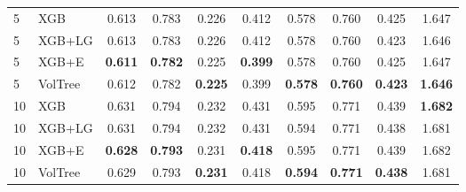 \documentclass[runningheads]{llncs}
\begin{document}
\begin{table}[t]
\begin{tabular}{ll cccc cccc}
\midrule
5 & XGB      & 0.613 & 0.783 & 0.226 & 0.412 & 0.578 & 0.760 & 0.425 & 1.647 \\ %
5 & XGB+LG   & 0.613 & 0.783 & 0.226 & 0.412 & 0.578 & 0.760 & 0.423 & 1.646 \\ %
5 & XGB+E    & \textbf{0.611} & \textbf{0.782} & 0.225 & \textbf{0.399} & 0.578 & 0.760 & 0.425 & 1.647 \\ %
5 & VolTree & 0.612 & 0.782 & \textbf{0.225} & 0.399 & \textbf{0.578} & \textbf{0.760} & \textbf{0.423} & \textbf{1.646} \\ %
\midrule
10 & XGB      & 0.631 & 0.794 & 0.232 & 0.431 & 0.595 & 0.771 & 0.439 & \textbf{1.682} \\ %
10 & XGB+LG   & 0.631 & 0.794 & 0.232 & 0.431 & 0.594 & 0.771 & 0.438 & 1.681 \\ %
10 & XGB+E    & \textbf{0.628} & \textbf{0.793} & 0.231 & \textbf{0.418} & 0.595 & 0.771 & 0.439 & 1.682 \\ %
10 & VolTree & 0.629 & 0.793 & \textbf{0.231} & 0.418 & \textbf{0.594} & \textbf{0.771} & \textbf{0.438} & 1.681 \\ %

\end{tabular}
\end{table}
\end{document}
